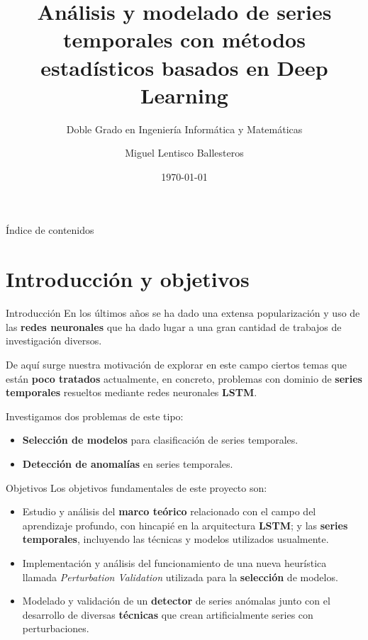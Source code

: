 \documentclass[spanish]{beamer}
\title{Análisis y modelado de series temporales con métodos estadísticos basados en Deep Learning}
\subtitle{Doble Grado en Ingeniería Informática y Matemáticas}
\date{\today}
\author{Miguel Lentisco Ballesteros}
\institute{Trabajo Fin de Grado \\\\\\ \textit{E.T.S de Ingenierías Informática y de Telecomunicación \\ Facultad de Ciencias}}
\begin{document}
\maketitle

\begin{frame}{Índice de contenidos}
  \tableofcontents[hideallsubsections]
\end{frame}

\section{Introducción y objetivos}

\begin{frame}{Introducción}
  En los últimos años se ha dado una extensa popularización y uso de las \textbf{redes neuronales} que ha dado lugar a una gran cantidad de trabajos de investigación diversos.\pause

  De aquí surge nuestra motivación de explorar en este campo ciertos temas que están \textbf{poco tratados} actualmente, en concreto, problemas con dominio de \textbf{series temporales} resueltos mediante redes neuronales \textbf{LSTM}.

  \pause

  Investigamos dos problemas de este tipo:
  \pause
  \begin{itemize}[<+->]
    \item \textbf{Selección de modelos} para clasificación de series temporales.
    \item \textbf{Detección de anomalías} en series temporales.
  \end{itemize}
\end{frame}

\begin{frame}{Objetivos}
  Los objetivos fundamentales de este proyecto son:
  \pause
  \begin{itemize}[<+->]
    \item Estudio y análisis del \textbf{marco teórico} relacionado con el campo del aprendizaje profundo, con hincapié en la arquitectura \textbf{LSTM}; y las \textbf{series temporales}, incluyendo las técnicas y modelos utilizados usualmente.
    \item Implementación y análisis del funcionamiento de una nueva heurística llamada \emph{Perturbation Validation} utilizada para la \textbf{selección} de modelos.
    \item Modelado y validación de un \textbf{detector} de series anómalas junto con el desarrollo de diversas \textbf{técnicas} que crean artificialmente series con perturbaciones.
  \end{itemize}
\end{frame}
\end{document}
